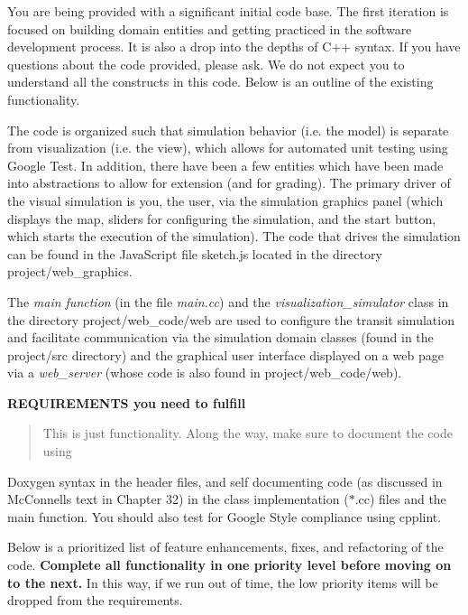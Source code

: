 You are being provided with a significant initial code base. The first iteration is focused on building domain entities and getting practiced in the software development process. It is also a drop into the depths of C++ syntax. If you have questions about the code provided, please ask. We do not expect you to understand all the constructs in this code. Below is an outline of the existing functionality.

The code is organized such that simulation behavior (i.\+e. the model) is separate from visualization (i.\+e. the view), which allows for automated unit testing using Google Test. In addition, there have been a few entities which have been made into abstractions to allow for extension (and for grading). The primary driver of the visual simulation is you, the user, via the simulation graphics panel (which displays the map, sliders for configuring the simulation, and the start button, which starts the execution of the simulation). The code that drives the simulation can be found in the Java\+Script file {\ttfamily sketch.\+js} located in the directory {\ttfamily project/web\+\_\+graphics}.

The {\itshape main function} (in the file {\itshape main.\+cc}) and the {\itshape visualization\+\_\+simulator} class in the directory {\ttfamily project/web\+\_\+code/web} are used to configure the transit simulation and facilitate communication via the simulation domain classes (found in the {\ttfamily project/src} directory) and the graphical user interface displayed on a web page via a {\itshape web\+\_\+server} (whose code is also found in {\ttfamily project/web\+\_\+code/web}).





{\bfseries R\+E\+Q\+U\+I\+R\+E\+M\+E\+N\+TS you need to fulfill}

\begin{quote}
This is just functionality. Along the way, make sure to document the code using \end{quote}
Doxygen syntax in the header files, and self documenting code (as discussed in Mc\+Connell\textquotesingle{}s text in Chapter 32) in the class implementation ($\ast$.cc) files and the main function. You should also test for Google Style compliance using cpplint.

Below is a prioritized list of feature enhancements, fixes, and refactoring of the code. {\bfseries Complete all functionality in one priority level before moving on to the next.} In this way, if we run out of time, the low priority items will be dropped from the requirements.

